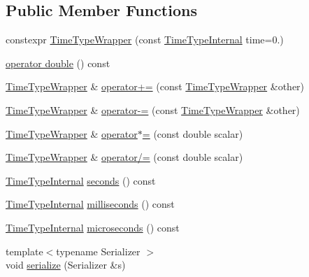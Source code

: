 \subsection*{Public Member Functions}
\begin{DoxyCompactItemize}
\item 
constexpr \hyperlink{structvt_1_1_time_type_wrapper_a9f7351384425b9fcf83bd1316dfe7d66}{Time\+Type\+Wrapper} (const \hyperlink{structvt_1_1_time_type_wrapper_a932f8d925e6c43e898fb8761ea667ef1}{Time\+Type\+Internal} time=0.)
\item 
\hyperlink{structvt_1_1_time_type_wrapper_a85dfb0b89e53e8b06325cc4ab4cd5972}{operator double} () const
\item 
\hyperlink{structvt_1_1_time_type_wrapper}{Time\+Type\+Wrapper} \& \hyperlink{structvt_1_1_time_type_wrapper_aa76022003bb022bb14ed92e59e12559d}{operator+=} (const \hyperlink{structvt_1_1_time_type_wrapper}{Time\+Type\+Wrapper} \&other)
\item 
\hyperlink{structvt_1_1_time_type_wrapper}{Time\+Type\+Wrapper} \& \hyperlink{structvt_1_1_time_type_wrapper_a46d946edc6cf56409f20901c7cb62efc}{operator-\/=} (const \hyperlink{structvt_1_1_time_type_wrapper}{Time\+Type\+Wrapper} \&other)
\item 
\hyperlink{structvt_1_1_time_type_wrapper}{Time\+Type\+Wrapper} \& \hyperlink{structvt_1_1_time_type_wrapper_a2a3dea4fda14272b8b25ebdf7fb4f4eb}{operator$\ast$=} (const double scalar)
\item 
\hyperlink{structvt_1_1_time_type_wrapper}{Time\+Type\+Wrapper} \& \hyperlink{structvt_1_1_time_type_wrapper_ad036b5d8434bd1771cd191fdc438396f}{operator/=} (const double scalar)
\item 
\hyperlink{structvt_1_1_time_type_wrapper_a932f8d925e6c43e898fb8761ea667ef1}{Time\+Type\+Internal} \hyperlink{structvt_1_1_time_type_wrapper_ae2979e22f260de5316d96b999a4cc4c2}{seconds} () const
\item 
\hyperlink{structvt_1_1_time_type_wrapper_a932f8d925e6c43e898fb8761ea667ef1}{Time\+Type\+Internal} \hyperlink{structvt_1_1_time_type_wrapper_a471abf813f0c77b6e15006da22e842f6}{milliseconds} () const
\item 
\hyperlink{structvt_1_1_time_type_wrapper_a932f8d925e6c43e898fb8761ea667ef1}{Time\+Type\+Internal} \hyperlink{structvt_1_1_time_type_wrapper_a319e11ba15bb76cd2e8abe2574ad093e}{microseconds} () const
\item 
{\footnotesize template$<$typename Serializer $>$ }\\void \hyperlink{structvt_1_1_time_type_wrapper_aa5c7311e8b108c65a4af7118163f18c8}{serialize} (Serializer \&s)
\end{DoxyCompactItemize}
